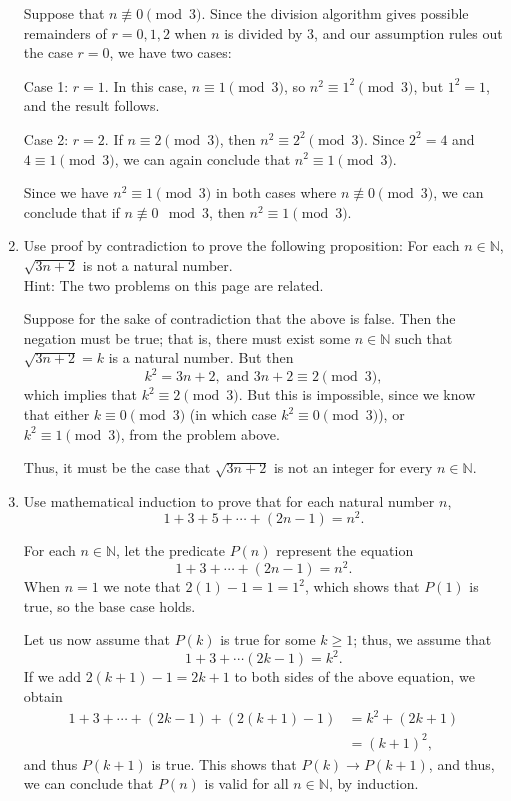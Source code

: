 \documentclass[12pt]{article}
\newcommand{\points}[1]{\marginpar{\hspace{24pt}[#1]}}
\newcommand{\N}{\mathbb{N}}
\begin{document}
\begin{enumerate}
\bigskip

Suppose that $n\not\equiv 0\pmod{3}$. Since the division algorithm gives possible remainders of $r=0,1,2$ when $n$ is divided by 3, and our assumption rules out the case $r=0$, we have two cases:

Case 1: $r=1$. In this case, $n\equiv 1\pmod{3}$, so $n^2\equiv 1^2\pmod{3}$, but $1^2=1$, and the result follows.

Case 2: $r=2$. If $n\equiv 2\pmod{3}$, then $n^2\equiv 2^2\pmod{3}$. Since $2^2=4$ and $4\equiv 1\pmod{3}$, we can again conclude that $n^2\equiv 1\pmod{3}$.

Since we have $n^2\equiv 1\pmod{3}$ in both cases where $n\not\equiv 0\pmod{3}$, we can conclude that if $n\not\equiv 0\mod{3}$, then $n^2\equiv 1\pmod{3}$.

\bigskip



\item Use proof by contradiction to prove the following proposition: For each $n\in \N$, $\sqrt{3n+2}$ is not a natural number. \points{5}\\
Hint: The two problems on this page are related.

\bigskip

Suppose for the sake of contradiction that the above is false. Then the negation must be true; that is, there must exist some $n\in\N$ such that $\sqrt{3n+2}=k$ is a natural number. But then
\[
 k^2 = 3n+2, \text{ and } 3n+2\equiv 2\pmod{3},
\]
which implies that $k^2 \equiv 2\pmod{3}$. But this is impossible, since we know that either $k\equiv 0\pmod{3}$ (in which case $k^2\equiv 0\pmod{3}$), or $k^2\equiv 1\pmod{3}$, from the problem above.

Thus, it must be the case that $\sqrt{3n+2}$ is not an integer for every $n\in\N$.
\newpage

\item Use mathematical induction to prove that for each natural number $n$, \points{6}
\[
1+3+5+\cdots + (2n-1) = n^2.
\]

\bigskip

For each $n\in \N$, let the predicate $P(n)$ represent the equation
\[
 1+3+\cdots + (2n-1) = n^2.
\]
When $n=1$ we note that $2(1)-1 = 1 = 1^2$, which shows that $P(1)$ is true, so the base case holds.

Let us now assume that $P(k)$ is true for some $k\geq 1$; thus, we assume that
\[
 1+3+\cdots (2k-1) = k^2.
\]
If we add $2(k+1)-1 = 2k+1$ to both sides of the above equation, we obtain
\begin{align*}
 1+3+\cdots + (2k-1)+(2(k+1)-1) & = k^2 + (2k+1)\\
& = (k+1)^2,
\end{align*}
and thus $P(k+1)$ is true. This shows that $P(k)\to P(k+1)$, and thus, we can conclude that $P(n)$ is valid for all $n\in\N$, by induction.

\end{enumerate}
\end{document}
